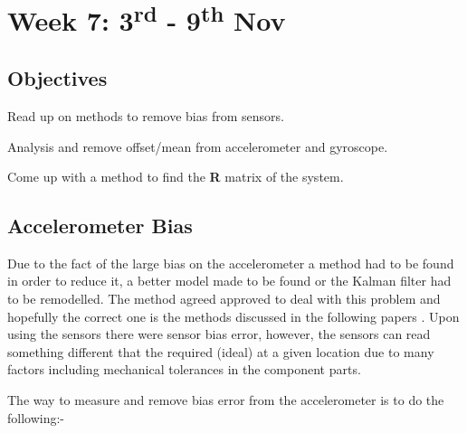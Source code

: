 \chapter{Week 7: 3\textsuperscript{rd} - 9\textsuperscript{th} Nov }

\tocless\section{Objectives}



\begin{itemize*}
	\item Read up on methods to remove bias from sensors.
	\item Analysis and remove offset/mean from accelerometer and gyroscope.
	\item Come up with a method to find the {\bf R} matrix of the system.
\end{itemize*}


\tocless\section{Accelerometer Bias }
Due to the fact of the large bias on the accelerometer a method had to be found in order to reduce it, a better model made to be found or the Kalman filter had to be remodelled. The method agreed approved to deal with this problem and hopefully the correct one is the methods discussed in the following papers
\cite{acclerometer_bais,Accelrometer_bias}. Upon using the sensors there were sensor bias error, however, the sensors can read something different that the required (ideal) at a given location due to many factors including mechanical tolerances in the component parts.


The way to measure and remove bias error from the accelerometer is to do the following:- 

